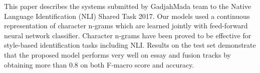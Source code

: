 This paper describes the systems submitted by GadjahMada team to the Native Language Identification (NLI) Shared Task 2017. Our models used a continuous representation of character n-grams which are learned jointly with feed-forward neural network classifier. Character n-grams have been proved to be effective for style-based identification tasks including NLI. Results on the test set demonstrate that the proposed model performs very well on essay and fusion tracks by obtaining more than 0.8 on both F-macro score and accuracy.
